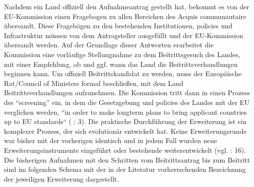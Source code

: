 Nachdem ein Land offiziell den Aufnahmeantrag gestellt hat, bekommt es von der EU-Kommission einen Fragebogen zu allen Bereichen des Acquis communautaire übersandt. Diese Fragebögen zu den bestehenden Institutionen, policies und Infrastruktur müssen von dem Antragsteller ausgefüllt und der EU-Kommission übersandt werden. Auf der Grundlage dieser Antworten erarbeitet die Kommission eine vorläufige Stellungnahme zu dem Beitrittsgesuch des Landes, mit einer Empfehlung, ob und ggf. wann das Land die Beitrittsverhandlungen beginnen kann. Um offiziell Beitrittskandidat zu werden, muss der Europäische Rat/Council of Ministers formal beschließen, mit dem Land Beitrittsverhandlungen aufzunehmen. Die Kommission tritt dann in einen Prozess des “screening” ein, in dem die Gesetzgebung und policies des Landes mit der EU verglichen werden, “in order to make longterm plans to bring applicant countries up to EU standards“ (\cite{grab10} : 3).
Die praktische Durchführung der Erweiterung ist ein komplexer Prozess, der sich evolutionär entwickelt hat. Keine Erweiterungsrunde war bisher mit der vorherigen identisch und in jedem Fall wurden neue Erweiterungsinstrumente eingeführt oder bestehende weiterentwickelt (vgl. \cite{kochenov} : 16). Die bisherigen Aufnahmen mit den Schritten vom Beitrittsantrag bis zum Beitritt sind im folgenden Schema mit der in der Literatur vorherrschenden Bezeichnung der jeweiligen Erweiterung dargestellt.\\
